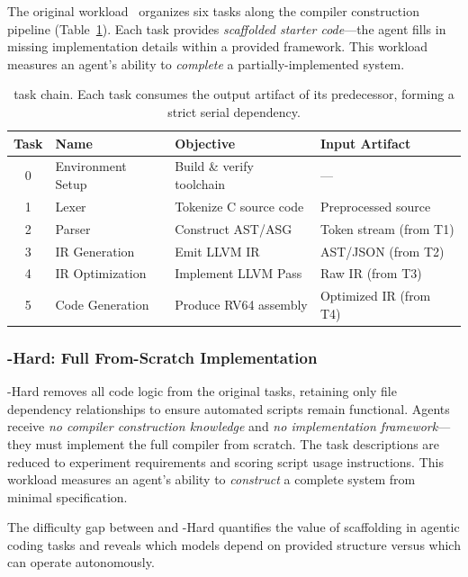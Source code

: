 The original \yatcc{} workload~\citep{yatcc2024} organizes six tasks along the compiler construction pipeline (Table~\ref{tab:tasks}).
Each task provides \emph{scaffolded starter code}---the agent fills in missing implementation details within a provided framework.
This workload measures an agent's ability to \emph{complete} a partially-implemented system.

\begin{table}[t]
\centering
\small
\begin{tabular}{clll}
\toprule
\textbf{Task} & \textbf{Name} & \textbf{Objective} & \textbf{Input Artifact} \\
\midrule
0 & Environment Setup & Build \& verify toolchain & --- \\
1 & Lexer & Tokenize C source code & Preprocessed source \\
2 & Parser & Construct AST/ASG & Token stream (from T1) \\
3 & IR Generation & Emit LLVM IR & AST/JSON (from T2) \\
4 & IR Optimization & Implement LLVM Pass & Raw IR (from T3) \\
5 & Code Generation & Produce RV64 assembly & Optimized IR (from T4) \\
\bottomrule
\end{tabular}
\caption{\eva{} task chain. Each task consumes the output artifact of its predecessor, forming a strict serial dependency.}
\label{tab:tasks}
\end{table}

\subsubsection{\yatcc{}-Hard: Full From-Scratch Implementation}

\yatcc{}-Hard removes all code logic from the original tasks, retaining only file dependency relationships to ensure automated scripts remain functional.
Agents receive \emph{no compiler construction knowledge} and \emph{no implementation framework}---they must implement the full compiler from scratch.
The task descriptions are reduced to experiment requirements and scoring script usage instructions.
This workload measures an agent's ability to \emph{construct} a complete system from minimal specification.

The difficulty gap between \yatcc{} and \yatcc{}-Hard quantifies the value of scaffolding in agentic coding tasks and reveals which models depend on provided structure versus which can operate autonomously.

